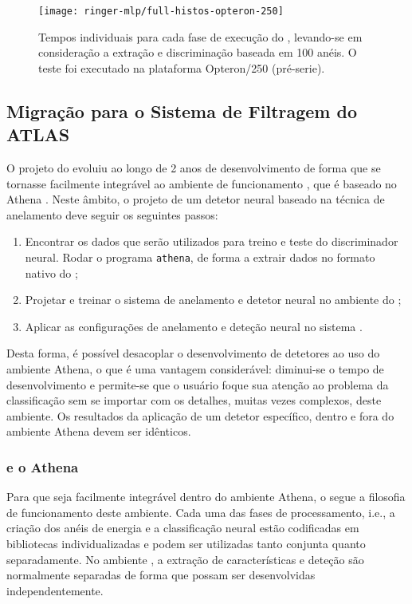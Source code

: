 \begin{figure}
\begin{center}
\texttt{[image: ringer-mlp/full-histos-opteron-250]}
\end{center}
\caption{Tempos individuais para cada fase de execução do ,
levando-se em consideração a extração e discriminação baseada em 100 anéis. O
teste foi executado na plataforma Opteron/250 (pré-serie).}
\label{fig:p1-full-histos}
\end{figure}

\subsection{Migração para o Sistema de Filtragem do ATLAS}

O projeto do  evoluiu ao longo de 2 anos de desenvolvimento
de forma que se tornasse facilmente integrável ao ambiente de funcionamento
, que é baseado no  Athena
\cite{athena:home-page, athena:devel-guide}. Neste âmbito, o projeto de um
detetor neural baseado na técnica de anelamento deve seguir os seguintes
passos:

\begin{enumerate}
\item Encontrar os dados que serão utilizados para treino e teste do
discriminador neural. Rodar o programa \texttt{athena}, de forma a extrair
dados no formato nativo do ;
\item Projetar e treinar o sistema de anelamento e detetor neural no ambiente
do ;
\item Aplicar as configurações de anelamento e deteção neural no sistema
.
\end{enumerate}

Desta forma, é possível desacoplar o desenvolvimento de detetores ao uso do
ambiente Athena, o que é uma vantagem considerável: diminui-se o tempo de
desenvolvimento e permite-se que o usuário foque sua atenção ao problema da
classificação sem se importar com os detalhes, muitas vezes complexos, deste
ambiente. Os resultados da aplicação de um detetor específico, dentro e fora
do ambiente Athena devem ser idênticos.

\subsubsection{ e o Athena}

Para que seja facilmente integrável dentro do ambiente Athena, o
 segue a filosofia de funcionamento deste ambiente. Cada uma
das fases de processamento, i.e., a criação dos anéis de energia e a
classificação neural estão codificadas em bibliotecas individualizadas e podem
ser utilizadas tanto conjunta quanto separadamente. No ambiente
, a extração de características e deteção são normalmente
separadas de forma que possam ser desenvolvidas independentemente.

